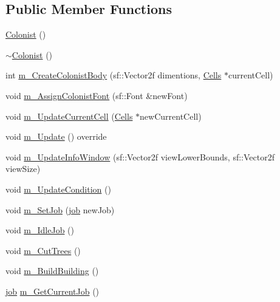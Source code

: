 \subsection*{Public Member Functions}
\begin{DoxyCompactItemize}
\item 
\mbox{\hyperlink{class_colonist_a6666c1c45bd7f52b423357828eaef598}{Colonist}} ()
\item 
\mbox{\hyperlink{class_colonist_a92d8c64b932a5eeeea9e873badb931cb}{$\sim$\+Colonist}} ()
\item 
int \mbox{\hyperlink{class_colonist_ae6111498494883c9509dc9f49cd2fa63}{m\+\_\+\+Create\+Colonist\+Body}} (sf\+::\+Vector2f dimentions, \mbox{\hyperlink{class_cells}{Cells}} $\ast$current\+Cell)
\item 
void \mbox{\hyperlink{class_colonist_a946c12abecdd1aa6c9be662eff8856ae}{m\+\_\+\+Assign\+Colonist\+Font}} (sf\+::\+Font \&new\+Font)
\item 
void \mbox{\hyperlink{class_colonist_a8c57004821ec2f9fc070c2f173c413e5}{m\+\_\+\+Update\+Current\+Cell}} (\mbox{\hyperlink{class_cells}{Cells}} $\ast$new\+Current\+Cell)
\item 
void \mbox{\hyperlink{class_colonist_ad51f196ece25322b1ab2a229875ac490}{m\+\_\+\+Update}} () override
\item 
void \mbox{\hyperlink{class_colonist_aef6c86dad183201cc5b4320869d73a6f}{m\+\_\+\+Update\+Info\+Window}} (sf\+::\+Vector2f view\+Lower\+Bounds, sf\+::\+Vector2f view\+Size)
\item 
void \mbox{\hyperlink{class_colonist_a5d7f2fdfe8edfbac71c00bd3f80db78b}{m\+\_\+\+Update\+Condition}} ()
\item 
void \mbox{\hyperlink{class_colonist_aa95eaa2ece608aceff02abbd69303721}{m\+\_\+\+Set\+Job}} (\mbox{\hyperlink{_colonist_8h_a7718e37d567b721003cf67cbd3125b4a}{job}} new\+Job)
\item 
void \mbox{\hyperlink{class_colonist_a9f7d167546dbc3cbbf79e9a8fdbb2c98}{m\+\_\+\+Idle\+Job}} ()
\item 
void \mbox{\hyperlink{class_colonist_a31ae6b8c4983b45489b77b92599fa971}{m\+\_\+\+Cut\+Trees}} ()
\item 
void \mbox{\hyperlink{class_colonist_ade6be47cebcac982789ba93d4bed5064}{m\+\_\+\+Build\+Building}} ()
\item 
\mbox{\hyperlink{_colonist_8h_a7718e37d567b721003cf67cbd3125b4a}{job}} \mbox{\hyperlink{class_colonist_aba477cb8f4eb974ffa72f1b519527922}{m\+\_\+\+Get\+Current\+Job}} ()
\item 

\end{DoxyCompactItemize}
